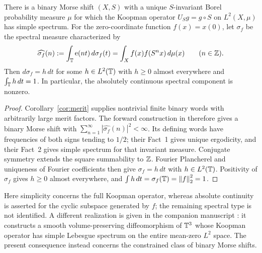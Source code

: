 \begin{corollary}\label{cor:morse}
There is a binary Morse shift $(X,S)$ with a unique $S$-invariant Borel
probability measure $\mu$ for which the Koopman operator
$U_Sg=g\circ S$ on $L^2(X,\mu)$ has simple spectrum. For the
zero-coordinate function $f(x)=x(0)$, let $\sigma_f$ be the spectral
measure characterized by
\[
 \widehat{\sigma_f}(n):=\int_{\mathbb T}\mathrm e(nt)\,d\sigma_f(t)
 =\int_X f(x)f(S^n x)\,d\mu(x)\qquad(n\in\mathbb Z).
\]
Then $d\sigma_f=h\,dt$ for some $h\in L^2(\mathbb T)$ with $h\ge0$ almost
everywhere and $\int_{\mathbb T}h\,dt=1$. In particular, the absolutely
continuous spectral component is nonzero.
\end{corollary}
\begin{proof}
Corollary~\ref{cor:merit} supplies nontrivial finite binary words with
arbitrarily large merit factors. The forward construction in
\cite[Theorem~2 and its proof]{DownarowiczLacroix1998} therefore gives a
binary Morse shift with $\sum_{n=1}^{\infty}|\widehat{\sigma_f}(n)|^2<\infty$.
Its defining words have frequencies of both signs tending to $1/2$;
their Fact~1 gives unique ergodicity, and their Fact~2 gives simple
spectrum for that invariant measure.
Conjugate symmetry extends the square summability to $\mathbb Z$. Fourier
Plancherel and uniqueness of Fourier coefficients then give
$\sigma_f=h\,dt$ with $h\in L^2(\mathbb T)$. Positivity of $\sigma_f$ gives
$h\ge0$ almost everywhere, and
$\int h\,dt=\sigma_f(\mathbb T)=\left\lVert f\right\rVert_2^2=1$.
\end{proof}

Here simplicity concerns the full Koopman operator, whereas absolute
continuity is asserted for the cyclic subspace generated by $f$; the
remaining spectral type is not identified. A different realization is
given in the companion manuscript \cite[Theorem~1.1]{OpenAIThreeTorus2026}:
it constructs a smooth volume-preserving diffeomorphism of $\mathbb T^3$ whose
Koopman operator has simple Lebesgue spectrum on the entire mean-zero
$L^2$ space. The present consequence instead concerns the constrained
class of binary Morse shifts.
